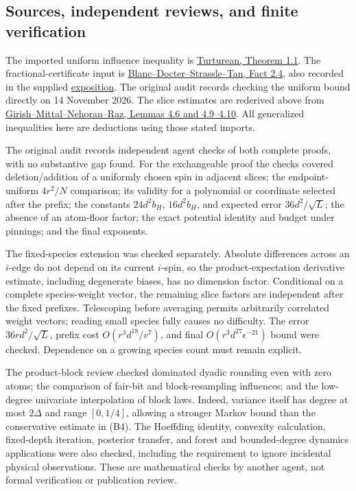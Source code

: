 \subsection{Sources, independent reviews, and finite verification}
\label{influence-recovery:review-and-verification}

The imported uniform influence inequality is
\href{https://arxiv.org/abs/2611.09773}{Turturean, Theorem 1.1}.
The fractional-certificate input is
\href{https://arxiv.org/html/2611.11626v1}{Blanc--Docter--Strassle--Tan,
Fact 2.4}, also recorded in the supplied
\href{https://guyblanc.github.io/AA_Exposition.pdf}{exposition}.
The original audit records checking the uniform bound directly on
14 November 2026. The slice estimates are rederived above from
\href{https://arxiv.org/html/2609.35327v1}{Girish--Mittal--Nehoran--Raz,
Lemmas 4.6 and 4.9--4.10}. All generalized inequalities here are
deductions using those stated imports.

The original audit records independent agent checks of both complete
proofs, with no substantive gap found. For the exchangeable proof the
checks covered deletion/addition of a uniformly chosen spin in adjacent
slices; the endpoint-uniform \(4r^2/N\) comparison; its validity for a
polynomial or coordinate selected after the prefix; the constants
\(24d^2b_H\), \(16d^2b_H\), and expected error \(36d^2/\sqrt L\);
the absence of an atom-floor factor; the exact potential identity and
budget under pinnings; and the final exponents.

The fixed-species extension was checked separately. Absolute differences
across an \(i\)-edge do not depend on its current \(i\)-spin, so the
product-expectation derivative estimate, including degenerate biases,
has no dimension factor. Conditional on a complete species-weight
vector, the remaining slice factors are independent after the fixed
prefixes. Telescoping before averaging permits arbitrarily correlated
weight vectors; reading small species fully causes no difficulty.
The error \(36rd^2/\sqrt L\), prefix cost \(O(r^3d^{18}/v^7)\),
and final \(O(r^3d^{27}\epsilon^{-21})\) bound were checked. Dependence
on a growing species count must remain explicit.

The product-block review checked dominated dyadic rounding even with
zero atoms; the comparison of fair-bit and block-resampling influences;
and the low-degree univariate interpolation of block laws. Indeed,
variance itself has degree at most \(2\Delta\) and range \([0,1/4]\),
allowing a stronger Markov bound than the conservative estimate in (B4).
The Hoeffding identity, convexity calculation, fixed-depth iteration,
posterior transfer, and forest and bounded-degree dynamics applications
were also checked, including the requirement to ignore incidental
physical observations. These are mathematical checks by another agent,
not formal verification or publication review.

